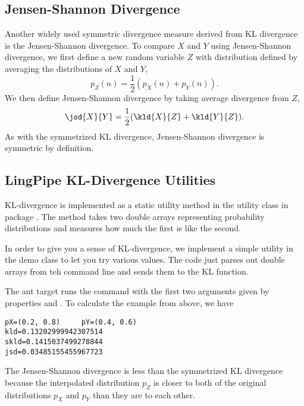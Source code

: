 \subsection{Jensen-Shannon Divergence}

Another widely used symmetric divergence measure derived from KL divergence
is the Jensen-Shannon divergence.  To compare $X$ and $Y$ using Jensen-Shannon
divergence, we first define a new random variable $Z$ with distribution defined by
averaging the distributions of $X$ and $Y$,
%
\[
p_Z(n) = \frac{1}{2}(p_X(n) + p_Y(n)).
\]
%
We then define Jensen-Shannon divergence by taking average divergence
from $Z$,
%
\begin{equation}
\jsd{X}{Y} = \frac{1}{2}(\kld{X}{Z} + \kld{Y}{Z}).
\end{equation}
%
As with the symmetrized KL divergence, Jensen-Shannon divergence is
symmetric by definition.


\subsection{LingPipe KL-Divergence Utilities}

KL-divergence is implemented as a static utility method in the
 utility class in package .
The method takes two double arrays representing probability
distributions and measures how much the first is like the second.

In order to give you a sense of KL-divergence, we implement a simple
utility in the demo class  to let you try various
values.  The code just parses out double arrays from teh command line
and sends them to the KL function.
%

The ant target  runs the command with the first two arguments
given by properties  and .  To calculate the example
from above, we have
%
\begin{verbatim}
pX=(0.2, 0.8)     pY=(0.4, 0.6)     
kld=0.13202999942307514    
skld=0.1415037499278844   
jsd=0.03485155455967723
\end{verbatim}
%
The Jensen-Shannon divergence is less than the symmetrized KL
divergence because the interpolated distribution $p_Z$ is closer to
both of the original distributions $p_X$ and $p_Y$ than they are to
each other.


